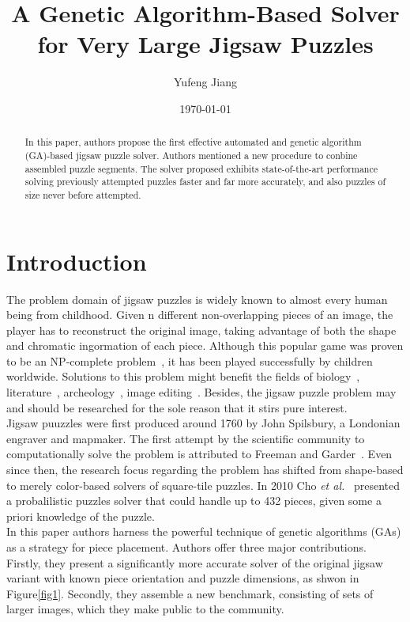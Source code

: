 \documentclass[10pt,twocolumn,letterpaper]{article}
\begin{document}
\title{A Genetic Algorithm-Based Solver for Very Large Jigsaw Puzzles
}
\author{Yufeng Jiang}
\date{\today}
\maketitle
\balance

\begin{abstract}
In this paper, authors propose the first effective automated and genetic algorithm (GA)-based jigsaw puzzle solver. Authors mentioned a new procedure to conbine assembled puzzle segments. The solver proposed exhibits state-of-the-art performance solving previously attempted puzzles faster and far more accurately, and also puzzles of size never before attempted.
\end{abstract}
\section{Introduction}
The problem domain of jigsaw puzzles is widely known to almost every human being from childhood. Given n different non-overlapping pieces of an image, the player has to reconstruct the original image, taking advantage of both the shape and chromatic ingormation of each piece. Although this popular game was proven to be an NP-complete problem~\cite{Solving,Jigsaw}, it has been played successfully by children worldwide. Solutions to this problem might benefit the fields of biology~\cite{Mitochondrial}, literature~\cite{Literary}, archeology~\cite{System,Computer}, image editing~\cite{Patch}. Besides, the jigsaw puzzle problem may and should be researched for the sole reason that it stirs pure interest.\\
\indent Jigsaw puuzzles were first produced around 1760 by John Spilsbury, a Londonian engraver and mapmaker. The first attempt by the scientific community to computationally solve the problem is attributed to Freeman and Garder~\cite{Puzzles}. Even since then, the research focus regarding the problem has shifted from shape-based to merely color-based solvers of square-tile puzzles. In 2010 Cho \emph{et al.}~\cite{Probabilistic} presented a probalilistic puzzles solver that could handle up to 432 pieces, given some a priori knowledge of the puzzle.\\
\indent In this paper authors harness the powerful technique of genetic algorithms (GAs) as a strategy for piece placement. Authors offer three major contributions. Firstly, they present a significantly more accurate solver of the original jigsaw variant with known piece orientation and puzzle dimensions, as shwon in Figure\ref{fig1}. Secondly, they assemble a new benchmark, consisting of sets of larger images, which they make public to the community.\\
\end{document}
